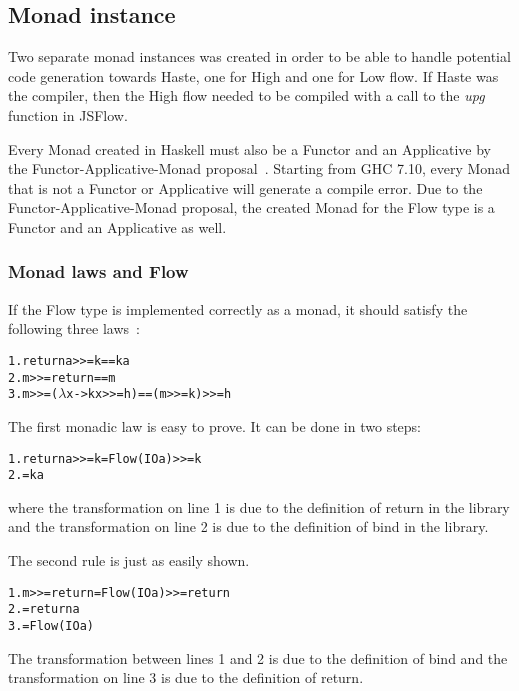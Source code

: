 \subsection{Monad instance}
Two separate monad instances was created in order to be able to handle potential code generation towards Haste, one for High and one for Low flow. If Haste was the compiler, then the High flow needed to be compiled with a call to the \emph{upg} function in JSFlow.

Every Monad created in Haskell must also be a Functor and an Applicative by the Functor-Applicative-Monad proposal~\cite{functor_applicative_monad}. Starting from GHC 7.10, every Monad that is not a Functor or Applicative will generate a compile error. Due to the Functor-Applicative-Monad proposal, the created Monad for the Flow type is a Functor and an Applicative as well.
\subsubsection{Monad laws and Flow}
If the Flow type is implemented correctly as a monad, it should satisfy the following three laws~\cite{functor-monad-law}:
\begin{alltt}
  1.  return a >>= k  ==  k a
  2.  m >>= return  ==  m
  3.  m >>= (\(\lambda\)x -> k x >>= h)  ==  (m >>= k) >>= h
\end{alltt}
The first monadic law is easy to prove. It can be done in two steps:
\begin{alltt}
  1. return a >>= k = Flow (IO a) >>= k
  2.                = k a
\end{alltt}
where the transformation on line 1 is due to the definition of return in the library and the transformation on line 2 is due to the definition of bind in the library.

The second rule is just as easily shown.
\begin{alltt}
  1. m >>= return = Flow (IO a) >>= return
  2.              = return a
  3.              = Flow (IO a)
\end{alltt}
The transformation between lines 1 and 2 is due to the definition of bind and the transformation on line 3 is due to the definition of return.

